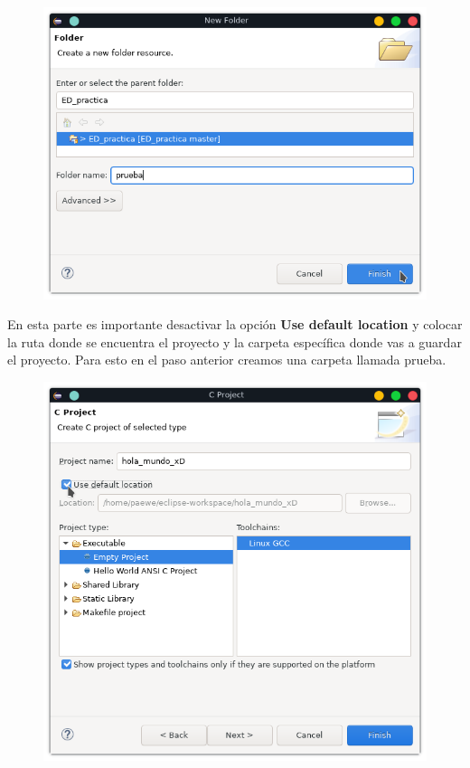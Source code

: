 \documentclass{article}
\begin{document}
\begin{figure}[h!]
  \centering
  \includegraphics[scale=0.75]{./Pictures/023_prueba_dir.png}
\end{figure}

En esta parte es importante desactivar la opción \textbf{Use default location}
y colocar la ruta donde se encuentra el proyecto y la carpeta específica donde
vas a guardar el proyecto. Para esto en el paso anterior creamos una carpeta
llamada prueba.\\

\begin{figure}[h!]
  \centering
  \includegraphics[scale=0.75]{./Pictures/022_desmarcar.png}
\end{figure}
\end{document}

